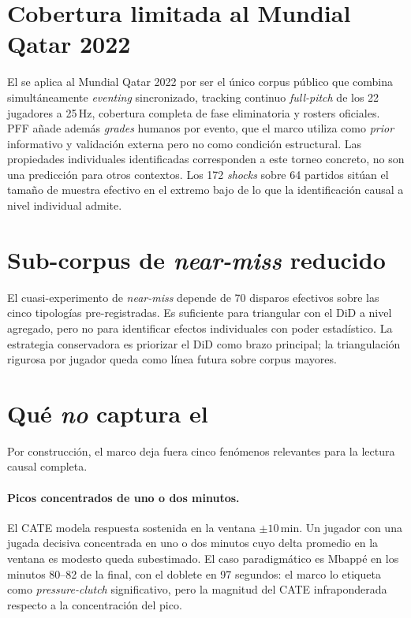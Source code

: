\section{Cobertura limitada al Mundial Qatar 2022}
\label{anexo:lim-cobertura}

El \CCV se aplica al Mundial Qatar 2022 por ser el único corpus
público que combina simultáneamente \textit{eventing} sincronizado,
tracking continuo \textit{full-pitch} de los 22 jugadores a 25\,Hz,
cobertura completa de fase eliminatoria y rosters oficiales. PFF
añade además \textit{grades} humanos por evento, que el marco utiliza
como \textit{prior} informativo y validación externa pero no como
condición estructural. Las propiedades individuales identificadas
corresponden a este torneo concreto, no son una predicción para otros
contextos. Los 172
\textit{shocks} sobre 64 partidos sitúan el tamaño de muestra
efectivo en el extremo bajo de lo que la identificación causal a
nivel individual admite.

\section{Sub-corpus de \textit{near-miss} reducido}
\label{anexo:lim-nearmiss}

El cuasi-experimento de \textit{near-miss} depende de 70 disparos
efectivos sobre las cinco tipologías pre-registradas. Es suficiente
para triangular con el DiD a nivel agregado, pero no para
identificar efectos individuales con poder estadístico. La
estrategia conservadora es priorizar el DiD como brazo principal;
la triangulación rigurosa por jugador queda como línea futura sobre
corpus mayores.

\section{Qué \textit{no} captura el \CCV}
\label{anexo:lim-no-captura}

Por construcción, el marco deja fuera cinco fenómenos relevantes
para la lectura causal completa.

\paragraph{Picos concentrados de uno o dos minutos.}
El CATE modela respuesta sostenida en la ventana $\pm 10$\,min. Un
jugador con una jugada decisiva concentrada en uno o dos minutos
cuyo delta promedio en la ventana es modesto queda subestimado. El
caso paradigmático es Mbappé en los minutos 80--82 de la final, con
el doblete en 97 segundos: el marco lo etiqueta como
\textit{pressure-clutch} significativo, pero la magnitud del CATE
infraponderada respecto a la concentración del pico.


